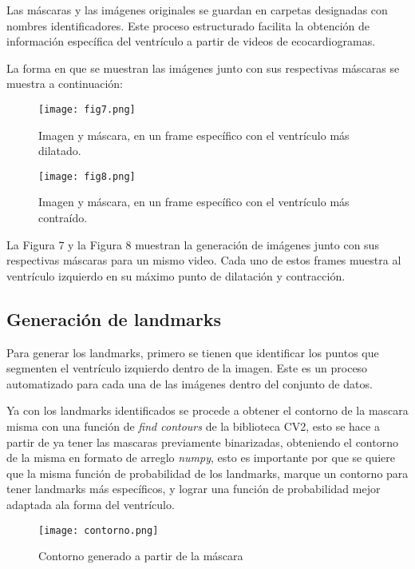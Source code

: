 \documentclass[runningheads]{llncs}
\begin{document}
Las máscaras y las imágenes originales se guardan en carpetas designadas con nombres identificadores. Este proceso estructurado facilita la obtención de información específica del ventrículo a partir de videos de ecocardiogramas.

La forma en que se muestran las imágenes junto con sus respectivas máscaras se muestra a continuación:

\begin{figure} [H]
    \centering
    \texttt{[image: fig7.png]}
    \caption{Imagen y máscara, en un frame específico con el ventrículo más dilatado.}
    \label{fig:fig7}
\end{figure}
\begin{figure} [H]
    \centering
    \texttt{[image: fig8.png]}
    \caption{Imagen y máscara, en un frame específico con el ventrículo más contraído.}
    \label{fig:fig8}
\end{figure}

La Figura 7 y la Figura 8 muestran la generación de imágenes junto con sus respectivas máscaras para un mismo video. Cada uno de estos frames muestra al ventrículo izquierdo en su máximo punto de dilatación y contracción.

\subsection{Generación de landmarks}

Para generar los landmarks, primero se tienen que identificar los puntos que segmenten el ventrículo izquierdo dentro de la imagen. Este es un proceso automatizado para cada una de las imágenes dentro del conjunto de datos.

Ya con los landmarks identificados se procede a obtener el contorno de la mascara misma con una función de \textit{find contours} de la biblioteca CV2, esto se hace a partir de ya tener las mascaras previamente binarizadas, obteniendo el contorno de la misma en formato de arreglo \textit{numpy}, esto es importante por que se quiere que la misma función de probabilidad de los landmarks, marque un contorno para tener landmarks más específicos, y lograr una función de probabilidad mejor adaptada ala forma del ventrículo.

\begin{figure} [H]
    \centering
    \texttt{[image: contorno.png]}
    \caption{Contorno generado a partir de la máscara}
    \label{fig:contorno}
\end{figure}
\end{document}
